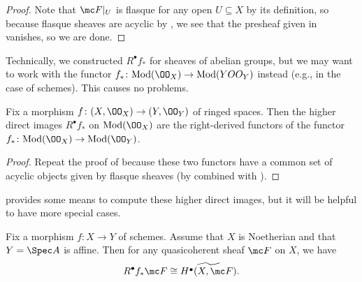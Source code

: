 \documentclass[../notes.tex]{subfiles}
\begin{document}
\begin{proof}
	Note that $\mc F|_U$ is flasque for any open $U\subseteq X$ by its definition, so because flasque sheaves are acyclic by , we see that the presheaf given in  vanishes, so we are done.
\end{proof}
Technically, we constructed $R^\bullet f_*$ for sheaves of abelian groups, but we may want to work with the functor $f_*\colon\mathrm{Mod}(\OO_X)\to\mathrm{Mod}(YOO_Y)$ instead (e.g., in the case of schemes). This causes no problems.
\begin{proposition}
	Fix a morphism $f\colon(X,\OO_X)\to(Y,\OO_Y)$ of ringed spaces. Then the higher direct images $R^\bullet f_*$ on $\mathrm{Mod}(\OO_X)$ are the right-derived functors of the functor $f_*\colon\mathrm{Mod}(\OO_X)\to\mathrm{Mod}(\OO_Y)$.
\end{proposition}
\begin{proof}
	Repeat the proof of  because these two functors have a common set of acyclic objects given by flasque sheaves (by  combined with ).
\end{proof}
 provides some means to compute these higher direct images, but it will be helpful to have more special cases.
\begin{proposition} \label{prop:higher-direct-image-affine}
	Fix a morphism $f\colon X\to Y$ of schemes. Assume that $X$ is Noetherian and that $Y=\Spec A$ is affine. Then for any quasicoherent sheaf $\mc F$ on $X$, we have
	\[R^\bullet f_*\mc F\cong\widetilde{H^\bullet(X,\mc F)}.\]
\end{proposition}
\end{document}
